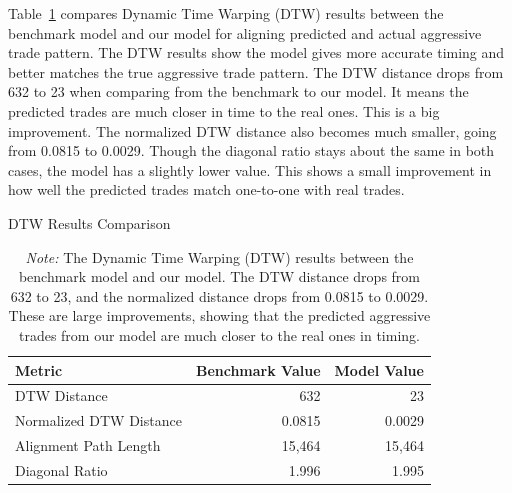 Table~\ref{tb:dtw_com} compares Dynamic Time Warping (DTW) results between the benchmark model and our model for aligning predicted and actual aggressive trade pattern. The DTW results show the model gives more accurate timing and better matches the true aggressive trade pattern. The DTW distance drops from 632 to 23 when comparing from the benchmark to our model. It means the predicted trades are much closer in time to the real ones. This is a big improvement. The normalized DTW distance also becomes much smaller, going from 0.0815 to 0.0029. Though the diagonal ratio stays about the same in both cases, the model has a slightly lower value. This shows a small improvement in how well the predicted trades match one-to-one with real trades.

\begin{table}[H]
    \centering
    \caption{DTW Results Comparison} \label{tb:dtw_com}
    \caption*{\textit{Note:} The Dynamic Time Warping (DTW) results between the benchmark model and our model. The DTW distance drops from 632 to 23, and the normalized distance drops from 0.0815 to 0.0029. These are large improvements, showing that the predicted aggressive trades from our model are much closer to the real ones in timing.}
    \begin{tabular}{lrr}
    \toprule
    Metric & Benchmark Value & Model Value\\
    \midrule
    DTW Distance & 632 & 23 \\  %
    Normalized DTW Distance & 0.0815 & 0.0029 \\  %
    Alignment Path Length & 15,464 & 15,464 \\
    Diagonal Ratio & 1.996 & 1.995 \\   %
    \bottomrule
    \end{tabular}
\end{table}

